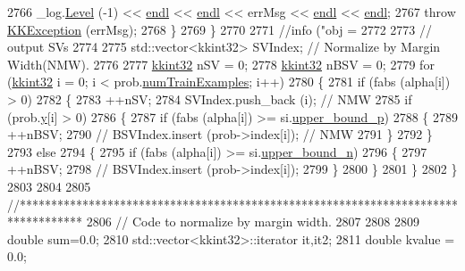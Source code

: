 \begin{DoxyCode}
2766         \_log.\hyperlink{class_k_k_b_1_1_run_log_a32cf761d7f2e747465fd80533fdbb659}{Level} (-1) << \hyperlink{namespace_k_k_b_ad1f50f65af6adc8fa9e6f62d007818a8}{endl} << \hyperlink{namespace_k_k_b_ad1f50f65af6adc8fa9e6f62d007818a8}{endl} << errMsg << \hyperlink{namespace_k_k_b_ad1f50f65af6adc8fa9e6f62d007818a8}{endl} << 
      \hyperlink{namespace_k_k_b_ad1f50f65af6adc8fa9e6f62d007818a8}{endl};
2767         \textcolor{keywordflow}{throw} \hyperlink{class_k_k_b_1_1_k_k_exception}{KKException} (errMsg);
2768       \}
2769   \}
2770 
2771   \textcolor{comment}{//info ("obj = %
2772 
2773   \textcolor{comment}{// output SVs}
2774 
2775   std::vector<kkint32> SVIndex;     \textcolor{comment}{// Normalize by Margin Width(NMW).}
2776 
2777   \hyperlink{namespace_k_k_b_a8fa4952cc84fda1de4bec1fbdd8d5b1b}{kkint32} nSV   = 0;
2778   \hyperlink{namespace_k_k_b_a8fa4952cc84fda1de4bec1fbdd8d5b1b}{kkint32} nBSV  = 0;
2779   \textcolor{keywordflow}{for}  (\hyperlink{namespace_k_k_b_a8fa4952cc84fda1de4bec1fbdd8d5b1b}{kkint32} i = 0;  i < prob.\hyperlink{struct_s_v_m289___m_f_s_1_1svm__problem_a16d137e053c79776e064691a20fa80ee}{numTrainExamples};  i++)
2780   \{
2781     \textcolor{keywordflow}{if}  (fabs (alpha[i]) > 0)
2782     \{
2783       ++nSV;
2784       SVIndex.push\_back (i);    \textcolor{comment}{// NMW}
2785       \textcolor{keywordflow}{if}  (prob.\hyperlink{struct_s_v_m289___m_f_s_1_1svm__problem_a56cf75f3e15322e1928a8294f9a55d2a}{y}[i] > 0)
2786       \{
2787         \textcolor{keywordflow}{if}  (fabs (alpha[i]) >= si.\hyperlink{struct_s_v_m289___m_f_s_1_1_solver_1_1_solution_info_a3bd42ac9799f94148cb7b2efeffd6590}{upper\_bound\_p})
2788         \{
2789           ++nBSV;
2790           \textcolor{comment}{// BSVIndex.insert (prob->index[i]);   // NMW}
2791         \}
2792       \}
2793       \textcolor{keywordflow}{else}
2794       \{
2795         \textcolor{keywordflow}{if}  (fabs (alpha[i]) >= si.\hyperlink{struct_s_v_m289___m_f_s_1_1_solver_1_1_solution_info_a2545a536d0eb0d1d2dc04a1402257f82}{upper\_bound\_n})
2796         \{
2797           ++nBSV;
2798           \textcolor{comment}{// BSVIndex.insert (prob->index[i]);}
2799         \}
2800       \}
2801     \}
2802   \}
2803 
2804 
2805   \textcolor{comment}{//**********************************************************************************}
2806   \textcolor{comment}{//  Code to normalize by margin width.}
2807 
2808   
2809   \textcolor{keywordtype}{double} sum=0.0;
2810   std::vector<kkint32>::iterator it,it2;
2811   \textcolor{keywordtype}{double} kvalue = 0.0;
}
\end{DoxyCode}
